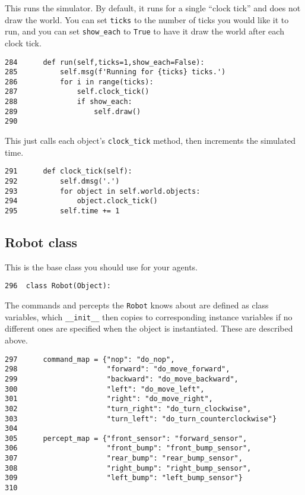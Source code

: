 \documentclass[11pt]{tufte-handout}
\begin{document}
This runs the simulator.  By default, it runs for a single ``clock tick'' and does not draw the world.  You can set \texttt{ticks} to the number of ticks you would like it to run, and you can set \texttt{show\_each} to \texttt{True} to have it draw the world after each clock tick.

\begin{verbatim}
284      def run(self,ticks=1,show_each=False):
285          self.msg(f'Running for {ticks} ticks.')
286          for i in range(ticks):
287              self.clock_tick()
288              if show_each:
289                  self.draw()
290  
\end{verbatim}

This just calls each object's \texttt{clock\_tick} method, then increments the simulated time.

\begin{verbatim}
291      def clock_tick(self):
292          self.dmsg('.')
293          for object in self.world.objects:
294              object.clock_tick()
295          self.time += 1
\end{verbatim}


\subsection{Robot class}
\label{sec:org892a3d0}

This is the base class you should use for your agents.

\begin{verbatim}
296  class Robot(Object):
\end{verbatim}

The commands and percepts the \texttt{Robot} knows about are defined as class variables, which \texttt{\_\_init\_\_} then copies to corresponding instance variables if no different ones are specified when the object is instantiated.  These are described above.

\begin{verbatim}
297      command_map = {"nop": "do_nop",
298                     "forward": "do_move_forward",
299                     "backward": "do_move_backward", 
300                     "left": "do_move_left", 
301                     "right": "do_move_right", 
302                     "turn_right": "do_turn_clockwise",
303                     "turn_left": "do_turn_counterclockwise"}
304  
305      percept_map = {"front_sensor": "forward_sensor", 
306                     "front_bump": "front_bump_sensor", 
307                     "rear_bump": "rear_bump_sensor", 
308                     "right_bump": "right_bump_sensor", 
309                     "left_bump": "left_bump_sensor"}
310  
\end{verbatim}
\end{document}
